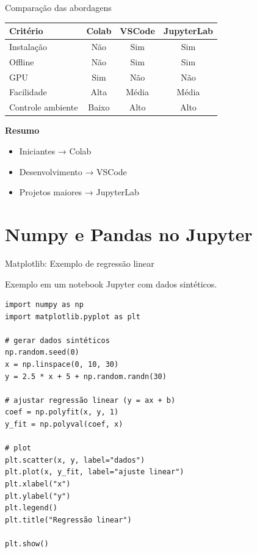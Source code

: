 \documentclass{beamer}
\begin{document}
\begin{frame}{Comparação das abordagens}
    
    \begin{center}
        \begin{tabular}{lccc}
            \textbf{Critério} & \textbf{Colab} & \textbf{VSCode} & \textbf{JupyterLab} \\
            \hline
            Instalação & Não & Sim & Sim \\
            Offline & Não & Sim & Sim \\
            GPU & Sim & Não & Não \\
            Facilidade & Alta & Média & Média \\
            Controle ambiente & Baixo & Alto & Alto \\
        \end{tabular}
    \end{center}
    
    \vspace{0.4cm}
    
    \textbf{Resumo}
    
    \begin{itemize}
        \item Iniciantes → Colab
        \item Desenvolvimento → VSCode
        \item Projetos maiores → JupyterLab
    \end{itemize}
    
\end{frame}



\section{Numpy e Pandas no Jupyter}

\begin{frame}[fragile]{Matplotlib: Exemplo de regressão linear}

Exemplo em um notebook Jupyter com dados sintéticos.

\vspace{0.3cm}

    \begin{verbatim}
import numpy as np
import matplotlib.pyplot as plt

# gerar dados sintéticos
np.random.seed(0)
x = np.linspace(0, 10, 30)
y = 2.5 * x + 5 + np.random.randn(30)

# ajustar regressão linear (y = ax + b)
coef = np.polyfit(x, y, 1)
y_fit = np.polyval(coef, x)

# plot
plt.scatter(x, y, label="dados")
plt.plot(x, y_fit, label="ajuste linear")
plt.xlabel("x")
plt.ylabel("y")
plt.legend()
plt.title("Regressão linear")

plt.show()
    \end{verbatim}

\end{frame}
\end{document}

